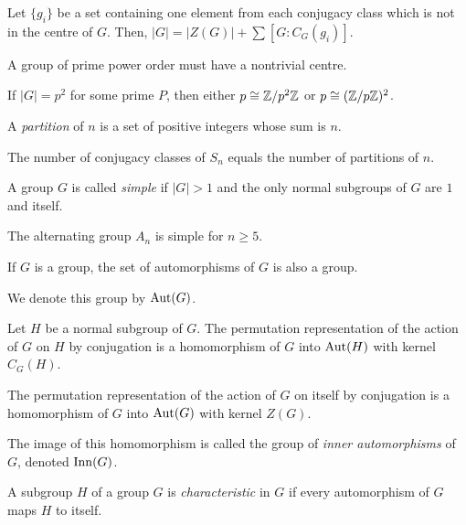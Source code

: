 \begin{cor}
    Let $\{g_i\}$ be a set containing one element from each conjugacy class
    which is not in the centre of $G$. Then,
    $|G|=|Z(G)|+\sum[G:C_G(g_i)]$.
\end{cor}
\begin{cor}
    A group of prime power order must have a nontrivial centre.
\end{cor}
\begin{cor}
    If $|G|=p^2$ for some prime $P$, then either $p\cong\mathbb{Z}/p^2\mathbb{Z}$ or
    $p\cong(\mathbb{Z}/p\mathbb{Z})^2$.
\end{cor}
\begin{defn}
    A \emph{partition} of $n$ is a set of positive integers whose sum is $n$.
\end{defn}
\begin{prop}
    The number of conjugacy classes of $S_n$ equals the number of partitions of
    $n$.
\end{prop}
\begin{defn}
    A group $G$ is called \emph{simple} if $|G|>1$ and the only normal subgroups
    of $G$ are $1$ and itself.
\end{defn}
\begin{prop}
    The alternating group $A_n$ is simple for $n\ge 5$.
\end{prop}
\begin{prop}
    If $G$ is a group, the set of automorphisms of $G$ is also a group.
\end{prop}
\begin{defn}
    We denote this group by $\mathrm{Aut}(G)$.
\end{defn}
\begin{prop}
    Let $H$ be a normal subgroup of $G$. 
    The permutation representation of the action of $G$ on $H$ by conjugation
    is a homomorphism of $G$ into $\mathrm{Aut}(H)$ with kernel $C_G(H)$.
\end{prop}
\begin{cor}
    The permutation representation of the action of $G$ on itself by conjugation
    is a homomorphism of $G$ into $\mathrm{Aut}(G)$ with kernel $Z(G)$.
\end{cor}
\begin{defn}
    The image of this homomorphism is called the group of \emph{inner
    automorphisms} of $G$, denoted $\mathrm{Inn}(G)$.
\end{defn}
\begin{defn}
    A subgroup $H$ of a group $G$ is \emph{characteristic} in $G$ if every
    automorphism of $G$ maps $H$ to itself.
\end{defn}
